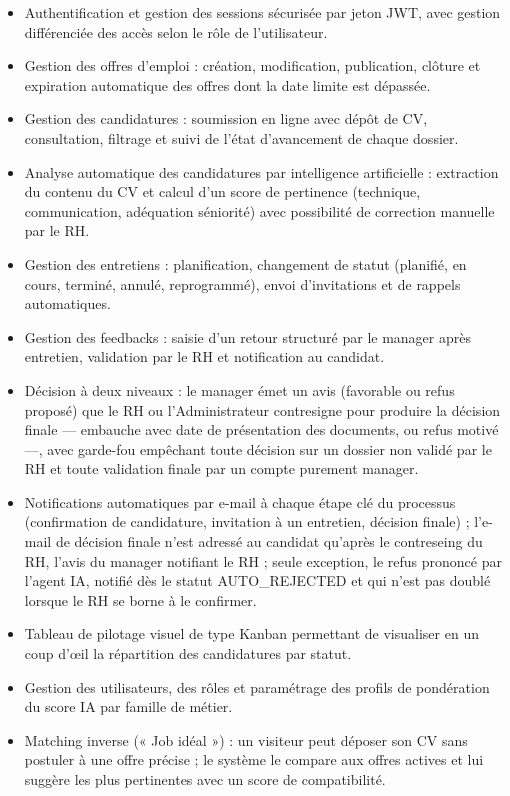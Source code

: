 \begin{itemize}
\item Authentification et gestion des sessions sécurisée par jeton JWT, avec gestion différenciée des accès selon le rôle de l’utilisateur.
\item Gestion des offres d’emploi : création, modification, publication, clôture et expiration automatique des offres dont la date limite est dépassée.
\item Gestion des candidatures : soumission en ligne avec dépôt de CV, consultation, filtrage et suivi de l’état d’avancement de chaque dossier.
\item Analyse automatique des candidatures par intelligence artificielle : extraction du contenu du CV et calcul d’un score de pertinence (technique, communication, adéquation séniorité) avec possibilité de correction manuelle par le RH.
\item Gestion des entretiens : planification, changement de statut (planifié, en cours, terminé, annulé, reprogrammé), envoi d’invitations et de rappels automatiques.
\item Gestion des feedbacks : saisie d’un retour structuré par le manager après entretien, validation par le RH et notification au candidat.
\item Décision à deux niveaux : le manager émet un avis (favorable ou refus proposé) que le RH ou l’Administrateur contresigne pour produire la décision finale — embauche avec date de présentation des documents, ou refus motivé —, avec garde-fou empêchant toute décision sur un dossier non validé par le RH et toute validation finale par un compte purement manager.
\item Notifications automatiques par e-mail à chaque étape clé du processus (confirmation de candidature, invitation à un entretien, décision finale) ; l’e-mail de décision finale n’est adressé au candidat qu’après le contreseing du RH, l’avis du manager notifiant le RH ; seule exception, le refus prononcé par l’agent IA, notifié dès le statut AUTO\_REJECTED et qui n’est pas doublé lorsque le RH se borne à le confirmer.
\item Tableau de pilotage visuel de type Kanban permettant de visualiser en un coup d’œil la répartition des candidatures par statut.
\item Gestion des utilisateurs, des rôles et paramétrage des profils de pondération du score IA par famille de métier.
\item Matching inverse (« Job idéal ») : un visiteur peut déposer son CV sans postuler à une offre précise ; le système le compare aux offres actives et lui suggère les plus pertinentes avec un score de compatibilité.
\end{itemize}

